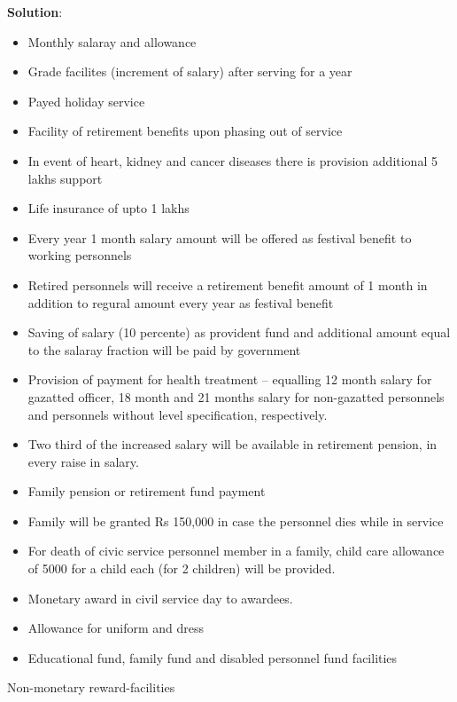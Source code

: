 \documentclass[
  openany]{book}
\newenvironment{solution}{ {\bfseries Solution}:}{}
\begin{document}
\begin{questions}
\begin{solution}
\begin{itemize}
\item Monthly salaray and allowance
\item Grade facilites (increment of salary) after serving for a year
\item Payed holiday service
\item Facility of retirement benefits upon phasing out of service
\item In event of heart, kidney and cancer diseases there is provision additional 5 lakhs support
\item Life insurance of upto 1 lakhs
\item Every year 1 month salary amount will be offered as festival benefit to working personnels
\item Retired personnels will receive a retirement benefit amount of 1 month in addition to regural amount every year as festival benefit
\item Saving of salary (10 percente) as provident fund and additional amount equal to the salaray fraction will be paid by government
\item Provision of payment for health treatment -- equalling 12 month salary for gazatted officer, 18 month and 21 months salary for non-gazatted personnels and personnels without level specification, respectively.
\item Two third of the increased salary will be available in retirement pension, in every raise in salary.
\item Family pension or retirement fund payment
\item Family will be granted Rs 150,000 in case the personnel dies while in service
\item For death of civic service personnel member in a family, child care allowance of 5000 for a child each (for 2 children) will be provided.
\item Monetary award in civil service day to awardees.
\item Allowance for uniform and dress
\item Educational fund, family fund and disabled personnel fund facilities
\end{itemize}

Non-monetary reward-facilities


\end{solution}
\end{questions}
\end{document}
